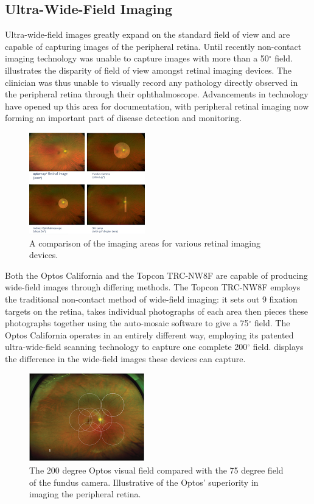 \subsection{Ultra-Wide-Field Imaging}

Ultra-wide-field images greatly expand on the standard field of view and are
capable of capturing images of the peripheral retina. Until recently
non-contact imaging technology was unable to capture images with more
than a 50$^\circ$ field.  illustrates the disparity of
field of view amongst retinal imaging devices. The clinician was thus
unable to visually record any pathology directly observed in the peripheral
retina through their ophthalmoscope. Advancements in technology have opened
up this area for documentation, with peripheral retinal imaging now forming
an important part of disease detection and monitoring.\cite{8_sides_media_2015}

\begin{figure}[H]
\centering
\includegraphics{figures/uwfcomparison}
\caption{A comparison of the imaging areas for various retinal imaging devices.}
\label{fig:uwfc}
   \end{figure}

Both the Optos California and the Topcon TRC-NW8F are capable of producing
wide-field images through differing methods. The Topcon TRC-NW8F employs
the traditional non-contact method of wide-field imaging: it sets out 9
fixation targets on the retina, takes individual photographs of each area
then pieces these photographs together using the auto-mosaic software to
give a 75$^\circ$ field. The Optos California operates in an entirely
different way, employing its patented ultra-wide-field scanning technology
to capture one complete 200$^\circ$ field.  displays the
difference in the wide-field images these devices can capture.

\begin{figure}[H]
\centering
\includegraphics{figures/uwfvs}
\caption{The 200 degree Optos visual field compared with the 75 degree field of the fundus camera. Illustrative of the Optos' superiority in imaging the peripheral retina.}
\label{fig:uwfvs}
   \end{figure}

